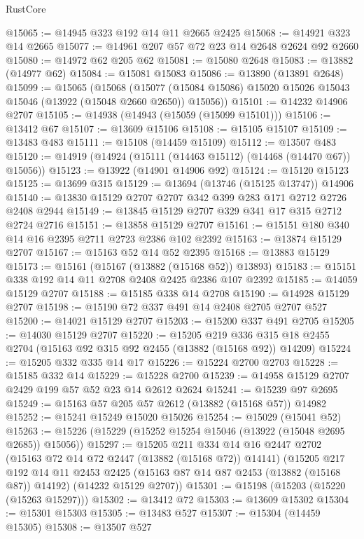 \begin{lexlean}{RustCore}
\begin{coremodule}
@15065 := @14945 @323 @192 @14 @11 @2665 @2425
@15068 := @14921 @323 @14 @2665
@15077 := @14961 @207 @57 @72 @23 @14 @2648 @2624 @92 @2660
@15080 := @14972 @62 @205 @62
@15081 := @15080 @2648
@15083 := @13882 (@14977 @62)
@15084 := @15081 @15083
@15086 := @13890 (@13891 @2648)
@15099 := @15065
    (@15068
      (@15077 (@15084 @15086) @15020 @15026 @15043 @15046 (@13922 (@15048 @2660 @2650)) @15056))
@15101 := @14232 @14906 @2707
@15105 := @14938 (@14943 (@15059 (@15099 @15101)))
@15106 := @13412 @67
@15107 := @13609 @15106
@15108 := @15105 @15107
@15109 := @13483 @483
@15111 := @15108 (@14459 @15109)
@15112 := @13507 @483
@15120 := @14919 (@14924 (@15111 (@14463 @15112) (@14468 (@14470 @67)) @15056))
@15123 := @13922 (@14901 @14906 @92)
@15124 := @15120 @15123
@15125 := @13699 @315
@15129 := @13694 (@13746 (@15125 @13747)) @14906
@15140 := @13830 @15129 @2707 @2707 @342 @399 @283 @171 @2712 @2726 @2408 @2944
@15149 := @13845 @15129 @2707 @329 @341 @17 @315 @2712 @2724 @2716
@15151 := @13858 @15129 @2707
@15161 := @15151 @180 @340 @14 @16 @2395 @2711 @2723 @2386 @102 @2392
@15163 := @13874 @15129 @2707
@15167 := @15163 @52 @14 @52 @2395
@15168 := @13883 @15129
@15173 := @15161 (@15167 (@13882 (@15168 @52)) @13893)
@15183 := @15151 @338 @192 @14 @11 @2708 @2408 @2425 @2386 @107 @2392
@15185 := @14059 @15129 @2707
@15188 := @15185 @338 @14 @2708
@15190 := @14928 @15129 @2707
@15198 := @15190 @72 @337 @491 @14 @2408 @2705 @2707 @527
@15200 := @14021 @15129 @2707
@15203 := @15200 @337 @491 @2705
@15205 := @14030 @15129 @2707
@15220 := @15205
    @219
    @336
    @315
    @18
    @2455
    @2704
    (@15163 @92 @315 @92 @2455 (@13882 (@15168 @92)) @14209)
@15224 := @15205 @332 @335 @14 @17
@15226 := @15224 @2700 @2703
@15228 := @15185 @332 @14
@15229 := @15228 @2700
@15239 := @14958 @15129 @2707 @2429 @199 @57 @52 @23 @14 @2612 @2624
@15241 := @15239 @97 @2695
@15249 := @15163 @57 @205 @57 @2612 (@13882 (@15168 @57)) @14982
@15252 := @15241 @15249 @15020 @15026
@15254 := @15029 (@15041 @52)
@15263 := @15226 (@15229 (@15252 @15254 @15046 (@13922 (@15048 @2695 @2685)) @15056))
@15297 := @15205
    @211
    @334
    @14
    @16
    @2447
    @2702
    (@15163 @72 @14 @72 @2447 (@13882 (@15168 @72)) @14141)
    (@15205
      @217
      @192
      @14
      @11
      @2453
      @2425
      (@15163 @87 @14 @87 @2453 (@13882 (@15168 @87)) @14192)
      (@14232 @15129 @2707))
@15301 := @15198 (@15203 (@15220 (@15263 @15297)))
@15302 := @13412 @72
@15303 := @13609 @15302
@15304 := @15301 @15303
@15305 := @13483 @527
@15307 := @15304 (@14459 @15305)
@15308 := @13507 @527

\end{coremodule}
\end{lexlean}
